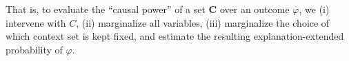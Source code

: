 \documentclass[twoside,11pt]{article}
\newtheorem{definition}{Definition}
\begin{document}
\noindent That is, to evaluate the ``causal power'' of a set $\mathbf{C}$  over an outcome $\varphi$, we (i) intervene with $C$, (ii) marginalize all variables, (iii) marginalize the choice of which context set is kept fixed, and estimate the resulting explanation-extended probability of $\varphi$.









\end{document}
